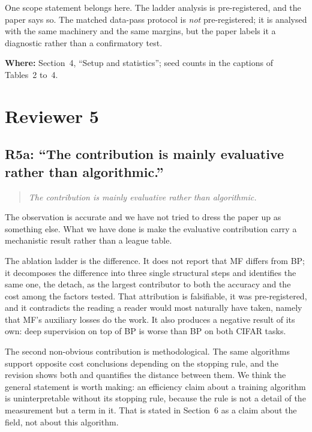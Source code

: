 \documentclass[11pt,a4paper]{article}
\newcommand{\MF}{MF}
\newcommand{\BP}{BP}
\newenvironment{comment}%
  {\begin{quote}\itshape\small}%
  {\end{quote}}
\newcommand{\where}[1]{\par\smallskip\noindent\textbf{Where:} #1\par}
\begin{document}
One scope statement belongs here. The ladder analysis is pre-registered, and
the paper says so. The matched data-pass protocol is \emph{not}
pre-registered; it is analysed with the same machinery and the same margins,
but the paper labels it a diagnostic rather than a confirmatory test.

\where{Section~4, ``Setup and statistics''; seed counts in the captions of
Tables~2 to~4.}

\section*{Reviewer 5}

\subsection*{R5a: ``The contribution is mainly evaluative rather than
algorithmic.''}

\begin{comment}
The contribution is mainly evaluative rather than algorithmic.
\end{comment}

\noindent
The observation is accurate and we have not tried to dress the paper up as
something else. What we have done is make the evaluative contribution carry a
mechanistic result rather than a league table.

The ablation ladder is the difference. It does not report that \MF{} differs
from \BP{}; it decomposes the difference into three single structural steps
and identifies the same one, the detach, as the largest contributor to both
the accuracy and the cost among the factors tested. That attribution is
falsifiable, it was pre-registered, and it contradicts the
reading a reader would most naturally have taken, namely that \MF{}'s
auxiliary losses do the work. It also produces a negative result of its own:
deep supervision on top of \BP{} is worse than \BP{} on both CIFAR tasks.

The second non-obvious contribution is methodological. The same algorithms support
opposite cost conclusions depending on the stopping rule, and the revision
shows both and quantifies the distance between them. We think the general
statement is worth making: an efficiency claim about a training algorithm is
uninterpretable without its stopping rule, because the rule is not a detail of
the measurement but a term in it. That is stated in Section~6 as a claim about
the field, not about this algorithm.
\end{document}
